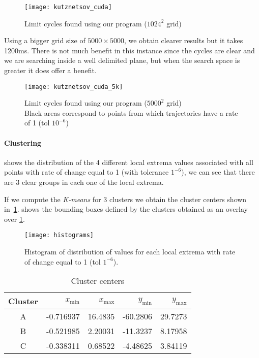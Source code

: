 \begin{figure}[H]
    \centering
    \texttt{[image: kutznetsov\_cuda]}
    \caption{Limit cycles found using our program ($1024^2$ grid)}%
    \label{fig:kuznetsov_cuda}
\end{figure}

Using a bigger grid size of $5000\times5000$, we obtain clearer results but it takes
1200ms. There is not much benefit in this instance since the cycles are clear and
we are searching inside a well delimited plane, but when the search space is greater
it does offer a benefit.

\begin{figure}[H]
    \centering
    \texttt{[image: kutznetsov\_cuda\_5k]}
    \caption{Limit cycles found using our program ($5000^2$ grid)\\
        Black areas correspond to points from which trajectories have
        a rate of 1 (tol $10^{-6}$)
    }%
    \label{fig:kuznetsov_cuda_5k}
\end{figure}

\paragraph{Clustering}

 shows the distribution of the 4 different local extrema
values associated with all points with rate of change equal to 1 (with tolerance
$1^{-6}$), we can see that there are 3 clear groups in each one of the local extrema.

If we compute the \emph{K-means} for 3 clusters we obtain the cluster centers shown
in~\cref{tab:clusters}.  shows the bounding boxes defined by the
clusters obtained as an overlay over \cref{fig:kuznetsov_cuda}.


\begin{figure}[H]
    \centering
    \texttt{[image: histograms]}
    \caption[Distribution values for local extrema]%
    {Histogram of distribution of values for each local extrema with rate of
        change equal to 1 (tol $1^{-6}$).
    }%
    \label{fig:histograms}
\end{figure}

\begin{table}[H]
    \centering
    \caption{Cluster centers}%
    \label{tab:clusters}
    \begin{tabular}{crrrr}
        \toprule
        Cluster & $x_{\min}$ & $x_{\max}$ & $y_{\min}$ & $y_{\max}$ \\ \midrule
        A & -0.716937 & 16.4835  & -60.2806  & 29.7273 \\
        B & -0.521985 &  2.20031 & -11.3237  &  8.17958 \\
        C & -0.338311 &  0.68522 &  -4.48625 &  3.84119 \\
        \bottomrule
    \end{tabular}
\end{table}

